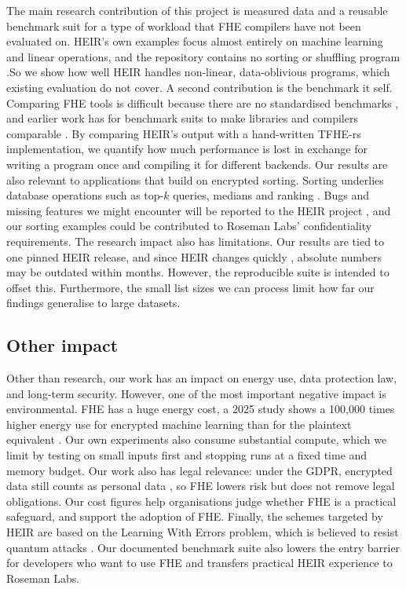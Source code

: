 The main research contribution of this project is measured data and a reusable benchmark suit for a type of workload that FHE compilers have not been evaluated on. HEIR's own examples focus almost entirely on machine learning and linear operations, and the repository contains no sorting or shuffling program \cite{Goo26}.So we show how well HEIR handles non-linear, data-oblivious programs, which existing evaluation do not cover.
\newline
\newline
A second contribution is the benchmark it self. Comparing FHE tools is difficult because there are no standardised benchmarks \cite{viand2021sok}, and earlier work has for benchmark suits to make libraries and compilers comparable \cite{gouert2022sok}. By comparing HEIR's output with a hand-written TFHE-rs implementation, we quantify how much performance is lost in exchange for writing a program once and compiling it for different backends.
\newline
\newline
Our results are also relevant to applications that build on encrypted
sorting. Sorting underlies database operations such as top-$k$ queries,
medians and ranking \cite{mazzone2024ranking}. Bugs and missing features we might encounter will be reported to the HEIR project , and our sorting examples could be contributed to Roseman Labs' confidentiality requirements. 
\newline
\newline
The research impact also has limitations. Our results are tied to one pinned
HEIR release, and since HEIR changes quickly \cite{Goo26}, absolute numbers
may be outdated within months. However, the reproducible suite is intended to offset
this. Furthermore, the small list sizes we can process limit how far our
findings generalise to large datasets.


\subsection{Other impact}

Other than research, our work has an impact on energy use, data protection law, and long-term security. However, one of the most important negative impact is environmental. FHE has a huge energy cost, a 2025 study shows a 100,000 times higher energy use for encrypted machine learning than for the plaintext equivalent \cite{damie2025energy}. Our own experiments also consume
substantial compute, which we limit by testing on small inputs first and
stopping runs at a fixed time and memory budget.
\newline
\newline
Our work also has legal relevance: under the GDPR, encrypted data still
counts as personal data \cite{edpb2025pseudo}, so FHE lowers risk but does not
remove legal obligations. Our cost figures help organisations judge whether
FHE is a practical safeguard, and support the adoption of FHE.
Finally, the schemes targeted by HEIR are based on the Learning With Errors
problem, which is believed to resist quantum attacks \cite{regev2009lwe}.
Our documented benchmark suite also lowers the entry barrier for developers
who want to use FHE and transfers practical HEIR experience to Roseman Labs.